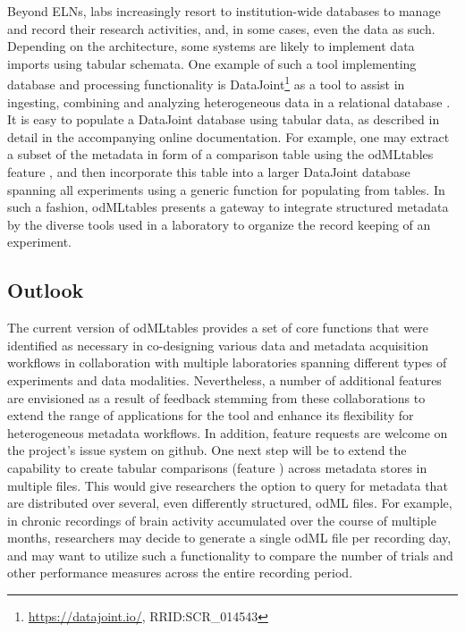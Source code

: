{Beyond ELNs, labs increasingly resort to institution-wide databases to manage and record their research activities, and, in some cases, even the data as such. Depending on the architecture, some systems are likely to implement data imports using tabular schemata. One example of such a tool implementing database and processing functionality is DataJoint\footnote{\url{https://datajoint.io/}, RRID:SCR\_014543} as a tool to assist in ingesting, combining and analyzing heterogeneous data in a relational database \citep{Yatsenko_2015}. It is easy to populate a DataJoint database using tabular data, as described in detail in the accompanying online documentation. For example, one may extract a subset of the metadata in form of a comparison table using the odMLtables feature \fcompare, and then incorporate this table into a larger DataJoint database spanning all experiments using a generic function for populating from  tables. In such a fashion, odMLtables presents a gateway to integrate structured metadata by the diverse tools used in a laboratory to organize the record keeping of an experiment.

\subsection{Outlook}
The current version of odMLtables provides a set of core functions that were identified as necessary in co-designing various data and metadata acquisition workflows in collaboration with multiple laboratories spanning different types of experiments and data modalities. Nevertheless, a number of additional features are envisioned as a result of feedback stemming from these collaborations to extend the range of applications for the tool and enhance its flexibility for heterogeneous metadata workflows. In addition, feature requests are welcome on the project's issue system on github. One next step will be to extend the capability to create tabular comparisons (feature \fcompare) across metadata stores in multiple files. This would give researchers the option to query for metadata that are distributed over several, even differently structured, odML files. For example, in chronic recordings of brain activity accumulated over the course of multiple months, researchers may decide to generate a single odML file per recording day, and may want to utilize such a functionality to compare the number of trials and other performance measures across the entire recording period.

}
